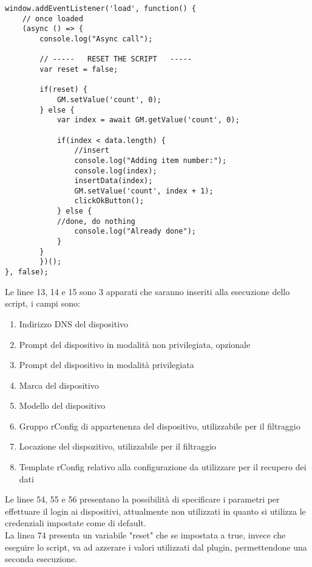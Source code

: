 \documentclass[Tesi.tex]{subfiles}
\begin{document}
\begin{lstlisting}[caption=My Javascript Example]
window.addEventListener('load', function() {
	// once loaded
	(async () => {
		console.log("Async call");
		
		// -----   RESET THE SCRIPT   -----
		var reset = false;
		
		if(reset) {
			GM.setValue('count', 0);
		} else {
			var index = await GM.getValue('count', 0);
			
			if(index < data.length) {
				//insert
				console.log("Adding item number:");
				console.log(index);
				insertData(index);
				GM.setValue('count', index + 1);
				clickOkButton();
			} else {
			//done, do nothing
				console.log("Already done");
			}   
		}
		})();
}, false);

\end{lstlisting}

Le linee 13, 14 e 15 sono 3 apparati che saranno inseriti alla esecuzione dello script, i campi sono:
\begin{enumerate}
	\item Indirizzo DNS del dispositivo
	\item Prompt del dispositivo in modalità non privilegiata, opzionale
	\item Prompt del dispositivo in modalità privilegiata
	\item Marca del dispositivo
	\item Modello del dispositivo
	\item Gruppo rConfig di appartenenza del dispositivo, utilizzabile per il filtraggio
	\item Locazione del dispozitivo, utilizzabile per il filtraggio
	\item Template rConfig relativo alla configurazione da utilizzare per il recupero dei dati
\end{enumerate}

Le linee 54, 55 e 56 presentano la possibilità di specificare i parametri per effettuare il login ai dispositivi, attualmente non utilizzati in quanto si utilizza le credenziali impostate come di default. \\
La linea 74 presenta un variabile "reset" che se impostata a true, invece che eseguire lo script, va ad azzerare i valori utilizzati dal plugin, permettendone una seconda esecuzione.
\end{document}
